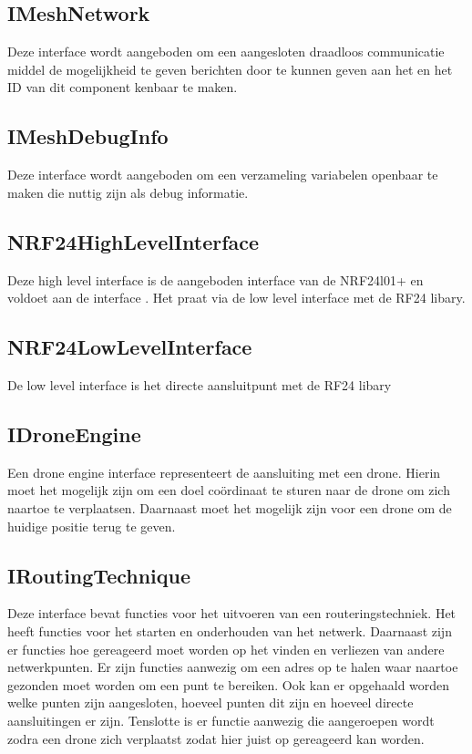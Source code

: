 \documentclass[a4paper, 11pt, oneside]{report}
\begin{document}
\subsection{IMeshNetwork}
\label{architectural:interfaces:IMeshNetwork}
Deze interface wordt aangeboden om een aangesloten draadloos communicatie middel de mogelijkheid te geven berichten door te kunnen geven aan het  en het ID van dit component kenbaar te maken.

\subsection{IMeshDebugInfo}
\label{architectural:interfaces:IMeshDebugInfo}
Deze interface wordt aangeboden om een verzameling variabelen openbaar te maken die nuttig zijn als debug informatie.

\subsection{NRF24HighLevelInterface}
\label{architectural:interfaces:NRF24HighLevelInterface}

Deze high level interface is de aangeboden interface van de NRF24l01+ en voldoet aan de interface . Het praat via de low level interface met de RF24 libary.  

\subsection{NRF24LowLevelInterface}
\label{architectural:interfaces:NRF24LowLevelInterface}
De low level interface is het directe aansluitpunt met de RF24 libary


\subsection{IDroneEngine}
\label{architectural:interfaces:IDroneEngine}
Een drone engine interface representeert de aansluiting met een drone.
Hierin moet het mogelijk zijn om een doel coördinaat te sturen naar de drone om zich naartoe te verplaatsen. 
Daarnaast moet het mogelijk zijn voor een drone om de huidige positie terug te geven.
\subsection{IRoutingTechnique}
\label{architectural:interfaces:IRoutingTechnique}
Deze interface bevat functies voor het uitvoeren van een routeringstechniek.
Het heeft functies voor het starten en onderhouden van het netwerk.
Daarnaast zijn er functies hoe gereageerd moet worden op het vinden en verliezen van andere netwerkpunten.
Er zijn functies aanwezig om een adres op te halen waar naartoe gezonden moet worden om een punt te bereiken.
Ook kan er opgehaald worden welke punten zijn aangesloten, hoeveel punten dit zijn en hoeveel directe aansluitingen er zijn.
Tenslotte is er functie aanwezig die aangeroepen wordt zodra een drone zich verplaatst zodat hier juist op gereageerd kan worden.
\end{document}
